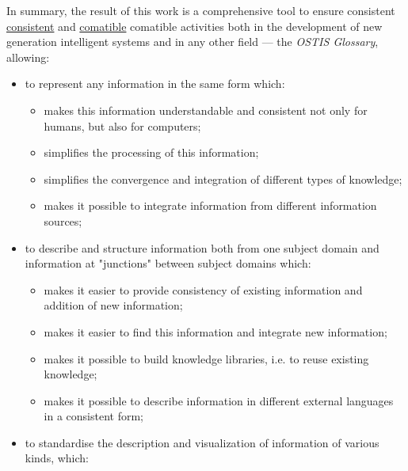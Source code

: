 \documentclass[10pt,a4paper]{article}
\begin{document}
\begin{multicols}{2}
In summary, the result of this work is a comprehensive
tool to ensure consistent \underline{consistent} and \underline{comatible} comatible activities both in
the development of new generation intelligent systems
and in any other field — the \textit{OSTIS Glossary}, allowing:
\begin{itemize}
    \item to represent any information in the same form which:
    \begin{itemize}
        \item makes this information understandable and consistent not only for humans, but also for computers;
        \item simplifies the processing of this information;
        \item simplifies the convergence and integration of different types of knowledge;
        \item makes it possible to integrate information from different information sources;
    \end{itemize}
    \item to describe and structure information both from one subject domain and information at "junctions" between subject domains which:
    \begin{itemize}
        \item makes it easier to provide consistency of existing information and addition of new information;
        \item makes it easier to find this information and integrate new information;
        \item makes it possible to build knowledge libraries, i.e. to reuse existing knowledge;
        \item makes it possible to describe information in different external languages in a consistent form;
    \end{itemize}
    \item to standardise the description and visualization of information of various kinds, which:
\end{itemize}
\end{multicols}
\end{document}
